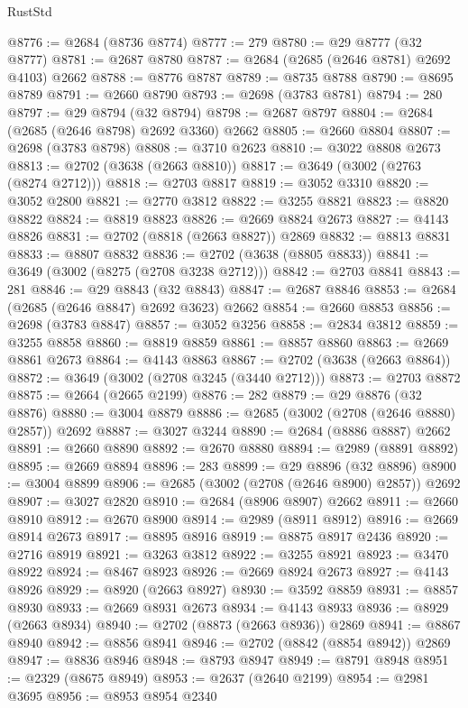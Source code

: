 \begin{lexlean}{RustStd}
\begin{coremodule}
@8776 := @2684 (@8736 @8774)
@8777 := 279
@8780 := @29 @8777 (@32 @8777)
@8781 := @2687 @8780
@8787 := @2684 (@2685 (@2646 @8781) @2692 @4103) @2662
@8788 := @8776 @8787
@8789 := @8735 @8788
@8790 := @8695 @8789
@8791 := @2660 @8790
@8793 := @2698 (@3783 @8781)
@8794 := 280
@8797 := @29 @8794 (@32 @8794)
@8798 := @2687 @8797
@8804 := @2684 (@2685 (@2646 @8798) @2692 @3360) @2662
@8805 := @2660 @8804
@8807 := @2698 (@3783 @8798)
@8808 := @3710 @2623
@8810 := @3022 @8808 @2673
@8813 := @2702 (@3638 (@2663 @8810))
@8817 := @3649 (@3002 (@2763 (@8274 @2712)))
@8818 := @2703 @8817
@8819 := @3052 @3310
@8820 := @3052 @2800
@8821 := @2770 @3812
@8822 := @3255 @8821
@8823 := @8820 @8822
@8824 := @8819 @8823
@8826 := @2669 @8824 @2673
@8827 := @4143 @8826
@8831 := @2702 (@8818 (@2663 @8827)) @2869
@8832 := @8813 @8831
@8833 := @8807 @8832
@8836 := @2702 (@3638 (@8805 @8833))
@8841 := @3649 (@3002 (@8275 (@2708 @3238 @2712)))
@8842 := @2703 @8841
@8843 := 281
@8846 := @29 @8843 (@32 @8843)
@8847 := @2687 @8846
@8853 := @2684 (@2685 (@2646 @8847) @2692 @3623) @2662
@8854 := @2660 @8853
@8856 := @2698 (@3783 @8847)
@8857 := @3052 @3256
@8858 := @2834 @3812
@8859 := @3255 @8858
@8860 := @8819 @8859
@8861 := @8857 @8860
@8863 := @2669 @8861 @2673
@8864 := @4143 @8863
@8867 := @2702 (@3638 (@2663 @8864))
@8872 := @3649 (@3002 (@2708 @3245 (@3440 @2712)))
@8873 := @2703 @8872
@8875 := @2664 (@2665 @2199)
@8876 := 282
@8879 := @29 @8876 (@32 @8876)
@8880 := @3004 @8879
@8886 := @2685 (@3002 (@2708 (@2646 @8880) @2857)) @2692
@8887 := @3027 @3244
@8890 := @2684 (@8886 @8887) @2662
@8891 := @2660 @8890
@8892 := @2670 @8880
@8894 := @2989 (@8891 @8892)
@8895 := @2669 @8894
@8896 := 283
@8899 := @29 @8896 (@32 @8896)
@8900 := @3004 @8899
@8906 := @2685 (@3002 (@2708 (@2646 @8900) @2857)) @2692
@8907 := @3027 @2820
@8910 := @2684 (@8906 @8907) @2662
@8911 := @2660 @8910
@8912 := @2670 @8900
@8914 := @2989 (@8911 @8912)
@8916 := @2669 @8914 @2673
@8917 := @8895 @8916
@8919 := @8875 @8917 @2436
@8920 := @2716 @8919
@8921 := @3263 @3812
@8922 := @3255 @8921
@8923 := @3470 @8922
@8924 := @8467 @8923
@8926 := @2669 @8924 @2673
@8927 := @4143 @8926
@8929 := @8920 (@2663 @8927)
@8930 := @3592 @8859
@8931 := @8857 @8930
@8933 := @2669 @8931 @2673
@8934 := @4143 @8933
@8936 := @8929 (@2663 @8934)
@8940 := @2702 (@8873 (@2663 @8936)) @2869
@8941 := @8867 @8940
@8942 := @8856 @8941
@8946 := @2702 (@8842 (@8854 @8942)) @2869
@8947 := @8836 @8946
@8948 := @8793 @8947
@8949 := @8791 @8948
@8951 := @2329 (@8675 @8949)
@8953 := @2637 (@2640 @2199)
@8954 := @2981 @3695
@8956 := @8953 @8954 @2340

\end{coremodule}
\end{lexlean}
